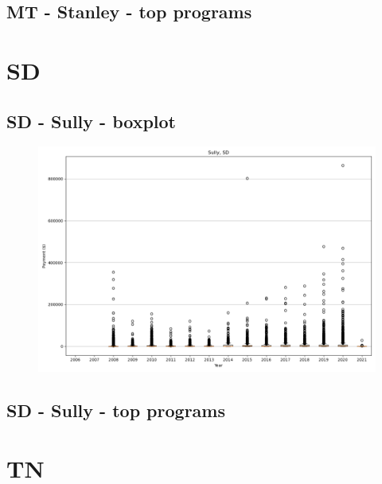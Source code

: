 \subsection*{MT - Stanley - top programs}

\newpage
\section*{SD}
\subsection*{SD - Sully - boxplot}
\begin{figure}[h]
\centering
\includegraphics[width=7in]{../output/boxplots/counties/Sully-SD_boxplot.png}
\end{figure}


\subsection*{SD - Sully - top programs}

\newpage
\section*{TN}

